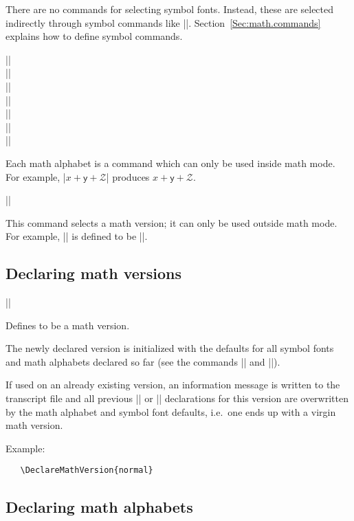 \documentclass{ltxguide}[1995/11/28]
\begin{document}
There are no commands for selecting symbol fonts.  Instead, these are
selected indirectly through symbol commands like |\oplus|.
Section~\ref{Sec:math.commands} explains how to define symbol commands.

\begin{decl}
  || \\
  || \\
  || \\
  || \\
  || \\
  || \\
  ||
\end{decl}
Each math alphabet is a command which can only be used inside math mode.
For example, |$x + \mathsf{y} + \mathcal{Z}$| produces
$x + \mathsf{y} + \mathcal{Z}$.

\begin{decl}
  ||
\end{decl}
This command selects a math version; it can only be used outside math
mode.  For example, |\boldmath| is defined to be ||.

\subsection{Declaring math versions}

\begin{decl}
  |\DeclareMathVersion| 
\end{decl}

Defines  to be a math version.

The newly declared version is initialized with the defaults for all
symbol fonts and math alphabets declared so far (see the commands
|\DeclareSymbolFont| and |\DeclareMathAlphabet|).

If used on an already existing version, an information message is
written to the transcript file and all previous |\SetSymbolFont| or
|\SetMathAlphabet| declarations for this version are overwritten by the
math alphabet and symbol font defaults, i.e.~one ends up with a virgin
math version.

Example:
\begin{verbatim}
   \DeclareMathVersion{normal}
\end{verbatim}

\subsection{Declaring math alphabets}
\end{document}
